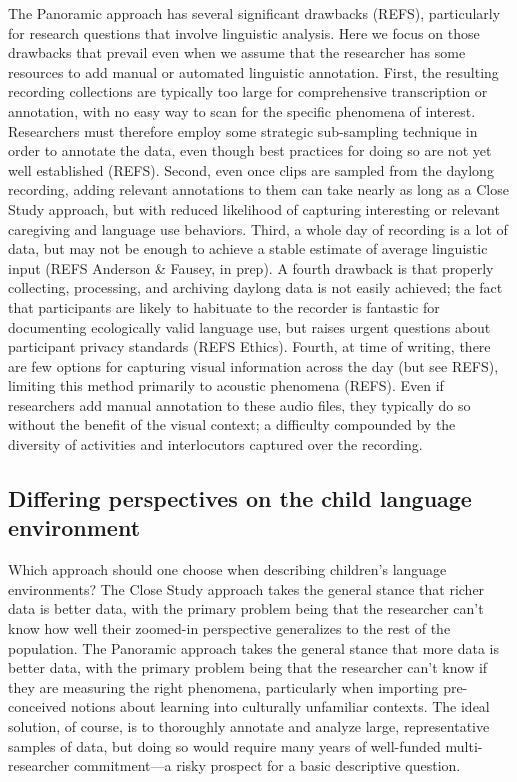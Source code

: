 \documentclass[,man,floatsintext]{apa6}
\begin{document}
The Panoramic approach has several significant drawbacks (REFS),
particularly for research questions that involve linguistic analysis.
Here we focus on those drawbacks that prevail even when we assume that
the researcher has some resources to add manual or automated linguistic
annotation. First, the resulting recording collections are typically too
large for comprehensive transcription or annotation, with no easy way to
scan for the specific phenomena of interest. Researchers must therefore
employ some strategic sub-sampling technique in order to annotate the
data, even though best practices for doing so are not yet well
established (REFS). Second, even once clips are sampled from the daylong
recording, adding relevant annotations to them can take nearly as long
as a Close Study approach, but with reduced likelihood of capturing
interesting or relevant caregiving and language use behaviors. Third, a
whole day of recording is a lot of data, but may not be enough to
achieve a stable estimate of average linguistic input (REFS Anderson \&
Fausey, in prep). A fourth drawback is that properly collecting,
processing, and archiving daylong data is not easily achieved; the fact
that participants are likely to habituate to the recorder is fantastic
for documenting ecologically valid language use, but raises urgent
questions about participant privacy standards (REFS Ethics). Fourth, at
time of writing, there are few options for capturing visual information
across the day (but see REFS), limiting this method primarily to
acoustic phenomena (REFS). Even if researchers add manual annotation to
these audio files, they typically do so without the benefit of the
visual context; a difficulty compounded by the diversity of activities
and interlocutors captured over the recording.

\subsection{Differing perspectives on the child language
environment}\label{differing-perspectives-on-the-child-language-environment}

Which approach should one choose when describing children's language
environments? The Close Study approach takes the general stance that
richer data is better data, with the primary problem being that the
researcher can't know how well their zoomed-in perspective generalizes
to the rest of the population. The Panoramic approach takes the general
stance that more data is better data, with the primary problem being
that the researcher can't know if they are measuring the right
phenomena, particularly when importing pre-conceived notions about
learning into culturally unfamiliar contexts. The ideal solution, of
course, is to thoroughly annotate and analyze large, representative
samples of data, but doing so would require many years of well-funded
multi-researcher commitment---a risky prospect for a basic descriptive
question.
\end{document}
